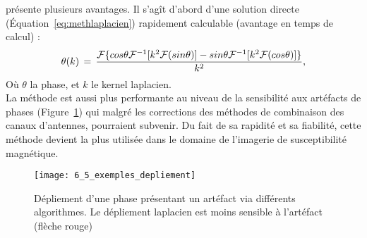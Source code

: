 {présente plusieurs avantages. Il s’agît d’abord d’une solution directe (Équation~\ref{eq:methlaplacien}) rapidement
calculable (avantage en temps de calcul) :
\begin{equation}
\label{eq:methlaplacien}
\theta(k)\,=\,\frac{{\cal F}\{cos\theta {\cal F}^{-1} [k^2{\cal F}(sin\theta)]-sin\theta{\cal F}^{-1}[k^2{\cal F}(cos\theta)]\}}{k^2},
\end{equation}
Où $\theta$ la phase, et $k$ le kernel laplacien.\\
La méthode est aussi plus performante au niveau de la sensibilité aux artéfacts de phases
(Figure~\ref{fig:6_5_exemples_depliement}) qui malgré les corrections des méthodes de combinaison des canaux d’antennes,
pourraient subvenir. Du fait de sa rapidité et sa fiabilité, cette méthode devient la plus utilisée dans le
domaine de l’imagerie de susceptibilité magnétique.
\begin{figure}[!t]
\centering
\texttt{[image: 6\_5\_exemples\_depliement]}
\caption{Dépliement d'une phase présentant un artéfact via différents algorithmes. Le dépliement laplacien est
moins sensible à l’artéfact (flèche rouge)}
\label{fig:6_5_exemples_depliement}	
\end{figure}
}

